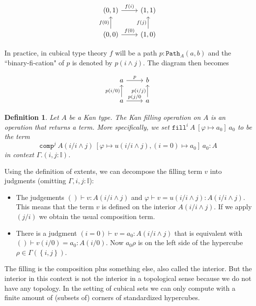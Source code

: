 \documentclass[11pt,a4paper,twoside,xetex,draft]{book}
\newcommand{\keyword}[1]{\emph{#1}\index{#1}}
\newtheorem{definition}[theorem]{Definition}
\newcommand{\op}[1]{\mathtt{#1}}
\newcommand{\pa}[3]{\op{Path}_{#1}\left(#2, #3\right)}
\newcommand{\fillt}[5]{\op{fill}^{#1} \ {#2} \ \left[{#3} \mapsto {#5} \right] \ {#5}}
\begin{document}
\[ \begin{tikzcd}
(0,1) \arrow[r, "f(i)" ] 
& (1,1)  \\
(0,0) 	\arrow[u, "f(0)"]	
	\arrow[r, "f(0)"]
& (1,0)  \arrow[u, "f(j)"] 
\end{tikzcd}
\]


In practice, in cubical type theory $f$ will be a path $p : \pa{A}{a}{b}$ and the ``binary-fi-cation" of $p$ is denoted by $p(i \wedge j)$. The diagram then becomes 

\[ \begin{tikzcd}
a \arrow[r, "p" ] 
& b  \\
a 	\arrow[u, "p(i/0)"]	
	\arrow[r, "p(j/0"]
& a  \arrow[u, "p(i/j)"] 
\end{tikzcd}
\]



\begin{definition}
Let $A$ be a Kan type. The Kan \keyword{filling} operation on $A$ is an operation that returns a term. More specifically, we set $\fillt{i}{A}{\varphi}{u}{a_0}$ to be the term $$\op{comp}^j \ A(i/i \wedge j) \ \left[\varphi \mapsto u(i/i \wedge j), (i=0) \mapsto a_0 \right] \ a_0 : A $$ in context $\Gamma . (i, j: \mathbb{I})$.
\end{definition}

Using the definition of extents, we can decompose the filling term $v$ into judgments (omitting $\Gamma, i,j : \mathbb{I}$):

\begin{itemize}

\item The judgements $()\vdash v : A(i/i \wedge j)$ and $\varphi \vdash v = u(i/i \wedge j) : A(i/i \wedge j)$. 
This means that the term $v$ is defined on the interior $A(i/i \wedge j)$. 
If we apply $(j/i)$ we obtain the usual composition term.

\item There is a judgment $(i = 0) \vdash v = a_0 : A(i/i \wedge j)$ that is equivalent with $() \vdash v(i/0) = a_0 : A(i/0)$. 
Now $a_0\rho$ is on the left side of the hypercube $\rho \in \Gamma \left( \left\{i,j\right\} \right)$.

\end{itemize}

The filling is the composition plus something else, also called the interior. But the interior in this context is not the interior in a topological sense because we do not have any topology. In the setting of cubical sets we can only compute with a finite amount of (subsets of) corners of standardized hypercubes.
\end{document}
